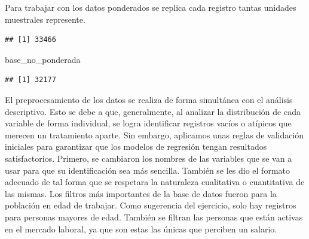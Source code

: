 \documentclass[
]{article}
\newenvironment{Shaded}{\begin{snugshade}}{\end{snugshade}}
\newcommand{\AttributeTok}[1]{\textcolor[rgb]{0.13,0.29,0.53}{#1}}
\newcommand{\FunctionTok}[1]{\textcolor[rgb]{0.13,0.29,0.53}{\textbf{#1}}}
\newcommand{\NormalTok}[1]{#1}
\newcommand{\OtherTok}[1]{\textcolor[rgb]{0.56,0.35,0.01}{#1}}
\newcommand{\SpecialCharTok}[1]{\textcolor[rgb]{0.81,0.36,0.00}{\textbf{#1}}}
\begin{document}
Para trabajar con los datos ponderados se replica cada registro tantas
unidades muestrales represente.

\begin{Shaded}
\end{Shaded}

\begin{verbatim}
## [1] 33466
\end{verbatim}

\begin{Shaded}
\begin{Highlighting}[]
\NormalTok{base\_no\_ponderada}
\end{Highlighting}
\end{Shaded}

\begin{verbatim}
## [1] 32177
\end{verbatim}

El preprocesamiento de los datos se realiza de forma simultánea con el
análisis descriptivo. Esto se debe a que, generalmente, al analizar la
distribución de cada variable de forma individual, se logra identificar
registros vacíos o atípicos que merecen un tratamiento aparte. Sin
embargo, aplicamos unas reglas de validación iniciales para garantizar
que los modelos de regresión tengan resultados satisfactorios. Primero,
se cambiaron los nombres de las variables que se van a usar para que su
identificación sea más sencilla. También se les dio el formato adecuado
de tal forma que se respetara la naturaleza cualitativa o cuantitativa
de las mismas. Los filtros más importantes de la base de datos fueron
para la población en edad de trabajar. Como sugerencia del ejercicio,
solo hay registros para personas mayores de edad. También se filtran las
personas que están activas en el mercado laboral, ya que son estas las
únicas que perciben un salario.
\end{document}
